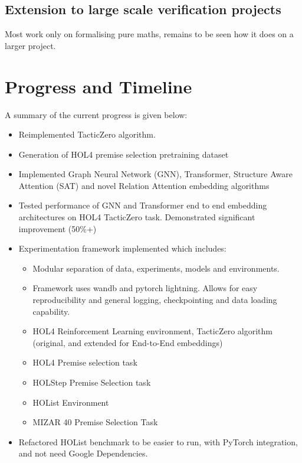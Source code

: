 \documentclass{article}
\begin{document}
    \subsection{Extension to large scale verification projects}\label{subsec:extension-to-large-scale-verification-projects}
    Most work only on formalising pure maths, remains to be seen how it does on a larger project.


    \section{Progress and Timeline}\label{sec:progress-and-timeline}
    A summary of the current progress is given below:

    \begin{itemize}
        \item Reimplemented TacticZero algorithm.
        \item Generation of HOL4 premise selection pretraining dataset
        \item Implemented Graph Neural Network (GNN), Transformer, Structure Aware Attention (SAT) and novel Relation Attention embedding algorithms
        \item Tested performance of GNN and Transformer end to end embedding architectures on HOL4 TacticZero task.
        Demonstrated significant improvement (50\%+)
        \item Experimentation framework implemented which includes:
        \begin{itemize}
            \item Modular separation of data, experiments, models and environments.
            \item Framework uses wandb and pytorch lightning.
            Allows for easy reproducibility and general logging, checkpointing and data loading capability.
            \item HOL4 Reinforcement Learning environment, TacticZero algorithm (original, and extended for End-to-End embeddings)
            \item HOL4 Premise selection task
            \item HOLStep Premise Selection task
            \item HOList Environment
            \item MIZAR 40 Premise Selection Task
        \end{itemize}
        \item Refactored HOList benchmark to be easier to run, with PyTorch integration, and not need Google Dependencies.
    \end{itemize}

    \printbibliography
\end{document}
